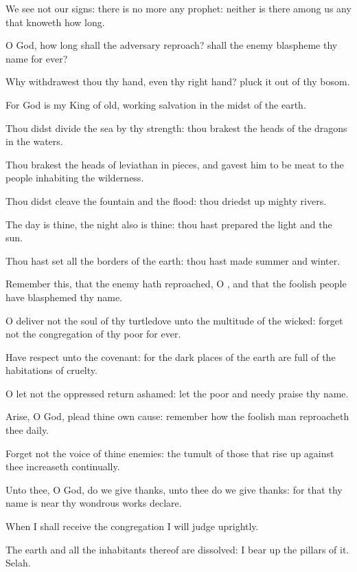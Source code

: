 \Verse We see not our signs: there is no more any prophet: neither is there among us any that knoweth how long.

\Verse O God, how long shall the adversary reproach? shall the enemy blaspheme thy name for ever?

\Verse Why withdrawest thou thy hand, even thy right hand? pluck it out of thy bosom.

\Verse For God is my King of old, working salvation in the midst of the earth.

\Verse Thou didst divide the sea by thy strength: thou brakest the heads of the dragons in the waters.

\Verse Thou brakest the heads of leviathan in pieces, and gavest him to be meat to the people inhabiting the wilderness.

\Verse Thou didst cleave the fountain and the flood: thou driedst up mighty rivers.

\Verse The day is thine, the night also is thine: thou hast prepared the light and the sun.

\Verse Thou hast set all the borders of the earth: thou hast made summer and winter.

\Verse Remember this, that the enemy hath reproached, O \LORD, and that the foolish people have blasphemed thy name.

\Verse O deliver not the soul of thy turtledove unto the multitude of the wicked: forget not the congregation of thy poor for ever.

\Verse Have respect unto the covenant: for the dark places of the earth are full of the habitations of cruelty.

\Verse O let not the oppressed return ashamed: let the poor and needy praise thy name.

\Verse Arise, O God, plead thine own cause: remember how the foolish man reproacheth thee daily.

\Verse Forget not the voice of thine enemies: the tumult of those that rise up against thee increaseth continually.




\Chapter
\Verse Unto thee, O God, do we give thanks, unto thee do we give thanks: for that thy name is near thy wondrous works declare.

\Verse When I shall receive the congregation I will judge uprightly.

\Verse The earth and all the inhabitants thereof are dissolved: I bear up the pillars of it. Selah.

